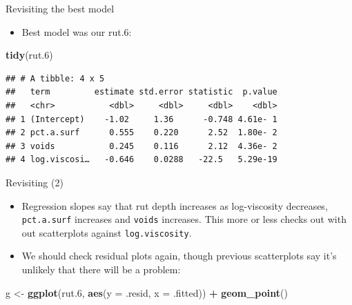 \documentclass[ignorenonframetext,]{beamer}
\newenvironment{Shaded}{\begin{snugshade}}{\end{snugshade}}
\newcommand{\DataTypeTok}[1]{\textcolor[rgb]{0.13,0.29,0.53}{#1}}
\newcommand{\FloatTok}[1]{\textcolor[rgb]{0.00,0.00,0.81}{#1}}
\newcommand{\KeywordTok}[1]{\textcolor[rgb]{0.13,0.29,0.53}{\textbf{#1}}}
\newcommand{\NormalTok}[1]{#1}
\newcommand{\OperatorTok}[1]{\textcolor[rgb]{0.81,0.36,0.00}{\textbf{#1}}}
\newcommand{\StringTok}[1]{\textcolor[rgb]{0.31,0.60,0.02}{#1}}
\providecommand{\tightlist}{%
  \setlength{\itemsep}{0pt}\setlength{\parskip}{0pt}}
\begin{document}
\begin{frame}[fragile]{Revisiting the best model}
\protect\hypertarget{revisiting-the-best-model}{}

\begin{itemize}
\tightlist
\item
  Best model was our rut.6:
\end{itemize}

\begin{Shaded}
\begin{Highlighting}[]
\KeywordTok{tidy}\NormalTok{(rut}\FloatTok{.6}\NormalTok{)}
\end{Highlighting}
\end{Shaded}

\begin{verbatim}
## # A tibble: 4 x 5
##   term         estimate std.error statistic  p.value
##   <chr>           <dbl>     <dbl>     <dbl>    <dbl>
## 1 (Intercept)    -1.02     1.36      -0.748 4.61e- 1
## 2 pct.a.surf      0.555    0.220      2.52  1.80e- 2
## 3 voids           0.245    0.116      2.12  4.36e- 2
## 4 log.viscosi…   -0.646    0.0288   -22.5   5.29e-19
\end{verbatim}

\end{frame}

\begin{frame}[fragile]{Revisiting (2)}
\protect\hypertarget{revisiting-2}{}

\begin{itemize}
\tightlist
\item
  Regression slopes say that rut depth increases as log-viscosity
  decreases, \texttt{pct.a.surf} increases and \texttt{voids} increases.
  This more or less checks out with out scatterplots against
  \texttt{log.viscosity}.
\item
  We should check residual plots again, though previous scatterplots say
  it's unlikely that there will be a problem:
\end{itemize}

\begin{Shaded}
\begin{Highlighting}[]
\NormalTok{g <-}\StringTok{ }\KeywordTok{ggplot}\NormalTok{(rut}\FloatTok{.6}\NormalTok{, }\KeywordTok{aes}\NormalTok{(}\DataTypeTok{y =}\NormalTok{ .resid, }\DataTypeTok{x =}\NormalTok{ .fitted)) }\OperatorTok{+}\StringTok{ }
\KeywordTok{geom_point}\NormalTok{()}
\end{Highlighting}
\end{Shaded}

\end{frame}
\end{document}
